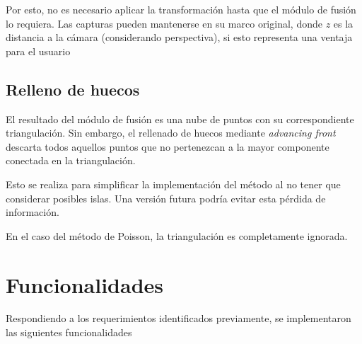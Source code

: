 \documentclass{pfc}
\begin{document}
		Por esto, no es necesario aplicar la transformación hasta que el módulo de fusión lo requiera.
		Las capturas pueden mantenerse en su marco original, 
		donde $z$ es la distancia a la cámara (considerando perspectiva),
		si esto representa una ventaja para el usuario

	\subsection{Relleno de huecos}
		El resultado del módulo de fusión es una nube de puntos con su correspondiente triangulación.
		Sin embargo, el rellenado de huecos mediante \emph{advancing front}
		descarta todos aquellos puntos que no pertenezcan
		a la mayor componente conectada en la triangulación.

		Esto se realiza para simplificar la implementación del método al no
		tener que considerar posibles islas.
		Una versión futura podría evitar esta pérdida de información.

		En el caso del método de Poisson, la triangulación es completamente ignorada.



	\section{Funcionalidades}
		Respondiendo a los requerimientos identificados previamente,
		se implementaron las siguientes funcionalidades
\end{document}
